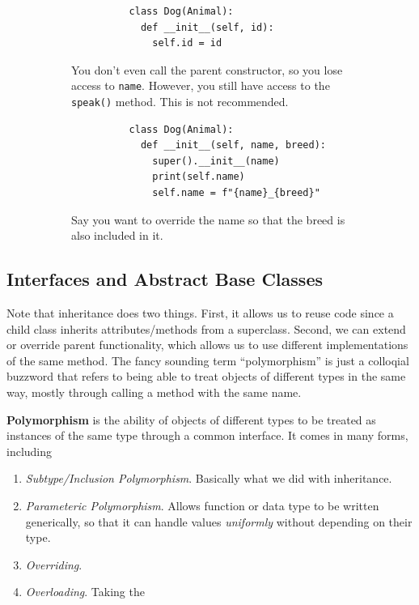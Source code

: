\begin{example}
\begin{figure}[H]
      \begin{subfigure}[b]{0.48\textwidth}
        \centering
        \begin{lstlisting}
          class Dog(Animal): 
            def __init__(self, id): 
              self.id = id
        \end{lstlisting}
        \caption{You don't even call the parent constructor, so you lose access to \texttt{name}. However, you still have access to the \texttt{speak()} method. This is not recommended.}
      \end{subfigure}
      \hfill 
      \begin{subfigure}[b]{0.48\textwidth}
        \centering
        \begin{lstlisting}
          class Dog(Animal): 
            def __init__(self, name, breed): 
              super().__init__(name)  
              print(self.name)
              self.name = f"{name}_{breed}"
        \end{lstlisting}
        \caption{Say you want to override the name so that the breed is also included in it.}
      \end{subfigure}
      \caption{}
    \end{figure}
  \end{example}

\subsection{Interfaces and Abstract Base Classes} 

  Note that inheritance does two things. First, it allows us to reuse code since a child class inherits attributes/methods from a superclass. Second, we can extend or override parent functionality, which allows us to use different implementations of the same method. The fancy sounding term ``polymorphism'' is just a colloqial buzzword that refers to being able to treat objects of different types in the same way, mostly through calling a method with the same name. 

  \begin{definition}[Polymorphism]
    \label{def:polymorphism}
    \textbf{Polymorphism} is the ability of objects of different types to be treated as instances of the same type through a common interface. It comes in many forms, including 
    \begin{enumerate}
      \item \textit{Subtype/Inclusion Polymorphism}. Basically what we did with inheritance. 
      \item \textit{Parameteric Polymorphism}. Allows function or data type to be written generically, so that it can handle values \textit{uniformly} without depending on their type. 
      \item \textit{Overriding}. 
      \item \textit{Overloading}. Taking the 
    \end{enumerate}
  \end{definition}

